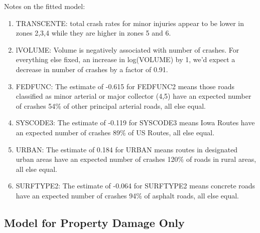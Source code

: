 \documentclass[a4paper]{article}\usepackage[]{graphicx}\usepackage[]{color}
\begin{document}
Notes on the fitted model:

\begin{enumerate}
\item
TRANSCENTE: total crash rates for minor injuries appear to be lower in zones 2,3,4 while they are higher in zones 5 and 6. 

\item
lVOLUME: Volume is negatively associated with number of crashes. For everything else fixed, an increase in log(VOLUME) by 1, we'd expect a decrease in number of crashes by a factor of 0.91.

\item
FEDFUNC: The estimate of -0.615 for FEDFUNC2 means those roads classified as minor arterial or major collector (4,5) have an expected number of crashes 54\% of other principal arterial roads, all else equal. 

\item
SYSCODE3: The estimate of -0.119 for SYSCODE3 means Iowa Routes have an expected number of crashes 89\% of US Routes, all else equal.

\item
URBAN: The estimate of 0.184 for URBAN means routes in designated urban areas have an expected number of crashes 120\% of roads in rural areas, all else equal.

\item
SURFTYPE2: The estimate of -0.064 for SURFTYPE2 means concrete roads have an expected number of crashes 94\% of asphalt roads, all else equal.

\end{enumerate}


\clearpage
\subsection{Model for Property Damage Only}
\end{document}
